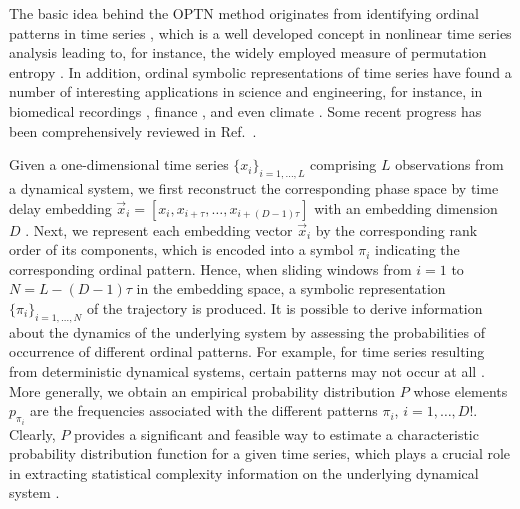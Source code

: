 \documentclass[aip,cha,reprint,nofootinbib]{revtex4-1}
\begin{document}
The basic idea behind the OPTN method originates from identifying ordinal patterns in time series \cite{BandtPRL2002}, which is a well developed concept in nonlinear time series analysis leading to, for instance, the widely employed measure of permutation entropy \cite{BandtPRL2002}. In addition, ordinal symbolic representations of time series have found a number of interesting applications in science and engineering, for instance, in biomedical recordings \cite{AmigoPTRSA2014}, finance \cite{ZaninChaos2008}, and even climate \cite{BarreiroChaos2011}. Some recent progress has been comprehensively reviewed in Ref.~\cite{AmigoPTRSA2014}. 

Given a one-dimensional time series $\{ x_i\}_{i=1, \ldots, L}$ comprising $L$ observations from a dynamical system, we first reconstruct the corresponding phase space by time delay embedding $\vec{x}_i = [x_i, x_{i+\tau}, \ldots, x_{i+(D-1)\tau}]$ with an embedding dimension $D$ \cite{Takens1981,Kantz97}. Next, we represent each embedding vector $\vec{x}_i$ by the corresponding rank order of its components, which is encoded into a symbol $\pi_{i}$ indicating the corresponding ordinal pattern. Hence, when sliding windows from $i=1$ to $N = L - (D - 1)\tau$ in the embedding space, a symbolic representation $\{\pi_i\}_{i=1, \ldots, N}$ of the trajectory is produced. It is possible to derive information about the dynamics of the underlying system by assessing the probabilities of occurrence of different ordinal patterns. For example, for time series resulting from deterministic dynamical systems, certain patterns may not occur at all \cite{AmigoEPL2007,AmigoEPL2008,ZaninChaos2008,RossoEPJB2012}. More generally, we obtain an empirical probability distribution $P$ whose elements $p_{\pi_{i}}$ are the frequencies associated with the different patterns $\pi_{i}$, $i = 1, \ldots, D!$. Clearly, $P$ provides a significant and feasible way to estimate a characteristic probability distribution function for a given time series, which plays a crucial role in extracting statistical complexity information on the underlying dynamical system \cite{BandtPRL2002,AmigoPTRSA2014}. 
\end{document}
